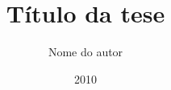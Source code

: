 \documentclass[en,prepmsc,twoside,12pt]{thesisdifctunl}
\title{Título da tese}
\author{Nome do autor}
\date{2010}
\begin{document}
\frontmatter

\frontpage

\presentationpage

\printdedicatory

\printacknowledgements

\printabstract

\tableofcontents 

\printotherlists 

\printchapters

\printbibliography

\printappendixes 

\end{document}
